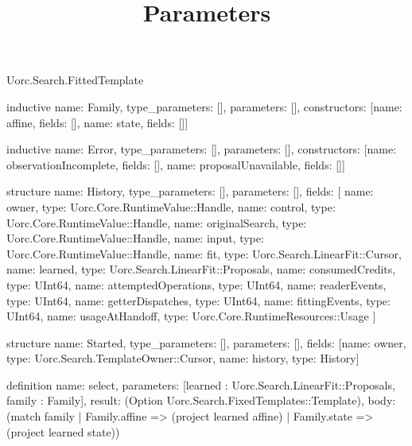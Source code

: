 \begin{lexlean}{Uorc.Search.FittedTemplate}
\title{Parameters}
\begin{semanticmodule}
inductive{
  name: Family,
  type_parameters: [],
  parameters: [],
  constructors: [{name: affine, fields: []}, {name: state, fields: []}]
}

inductive{
  name: Error,
  type_parameters: [],
  parameters: [],
  constructors: [{name: observationIncomplete, fields: []}, {name: proposalUnavailable, fields: []}]
}

structure{
  name: History,
  type_parameters: [],
  parameters: [],
  fields: [
    {name: owner, type: Uorc.Core.RuntimeValue::Handle},
    {name: control, type: Uorc.Core.RuntimeValue::Handle},
    {name: originalSearch, type: Uorc.Core.RuntimeValue::Handle},
    {name: input, type: Uorc.Core.RuntimeValue::Handle},
    {name: fit, type: Uorc.Search.LinearFit::Cursor},
    {name: learned, type: Uorc.Search.LinearFit::Proposals},
    {name: consumedCredits, type: UInt64},
    {name: attemptedOperations, type: UInt64},
    {name: readerEvents, type: UInt64},
    {name: getterDispatches, type: UInt64},
    {name: fittingEvents, type: UInt64},
    {name: usageAtHandoff, type: Uorc.Core.RuntimeResources::Usage}
  ]
}

structure{
  name: Started,
  type_parameters: [],
  parameters: [],
  fields: [{name: owner, type: Uorc.Search.TemplateOwner::Cursor}, {name: history, type: History}]
}

definition{
  name: select,
  parameters: [learned : Uorc.Search.LinearFit::Proposals, family : Family],
  result: (Option Uorc.Search.FixedTemplates::Template),
  body: (match family
    | Family.affine => (project learned affine)
    | Family.state => (project learned state))
}


\end{semanticmodule}
\end{lexlean}
